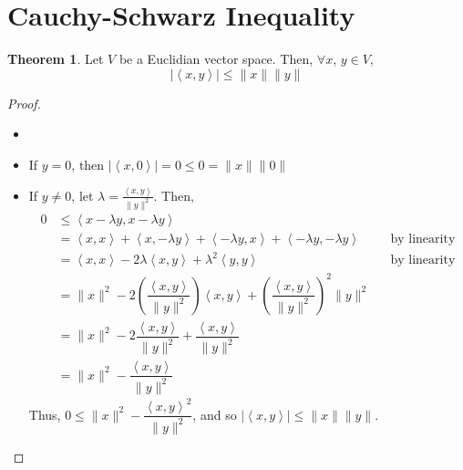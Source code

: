 \documentclass[letterpaper,12pt]{article}
\theoremstyle{definition}
\newtheorem*{theorem}{Theorem}
\newcommand{\abs}[1]{\left\lvert #1 \right\rvert} %
\newcommand{\inp}[2]{\left< #1, #2 \right>}
\newcommand{\norm}[1]{\| #1 \|}
\begin{document}
\section*{Cauchy-Schwarz Inequality}
\begin{theorem}
Let $V$ be a Euclidian vector space. Then, $\forall x$, $y \in V$,
\begin{equation*}
    \boxed{\abs{\inp{x}{y}} \leq \norm{x} \norm{y}}
\end{equation*}
\end{theorem}
\begin{proof}
\begin{itemize}
    \item[]
    \item If $y = 0$, then $\abs{\inp{x}{0}} = 0 \leq 0 = \norm{x} \norm{0}$
    \item If $y \neq 0$, let $\lambda = \frac{\inp{x}{y}}{\norm{y}^2}$. Then,
    \begin{align*}
        0 & \leq \inp{x - \lambda y}{x - \lambda y} \\
        & = \inp{x}{x} + \inp{x}{-\lambda y} + \inp{-\lambda y}{x} + \inp{-\lambda y}{-\lambda y} && \text{by linearity} \\
        & = \inp{x}{x} - 2 \lambda \inp{x}{y} + \lambda^2 \inp{y}{y} && \text{by linearity} \\
        & = \norm{x}^2 - 2\left(\dfrac{\inp{x}{y}}{\norm{y}^2} \right) \inp{x}{y} + \left(\dfrac{\inp{x}{y}}{\norm{y}^2} \right)^2 \norm{y}^2 \\
        & = \norm{x}^2 - 2 \dfrac{\inp{x}{y}}{\norm{y}^2} + \dfrac{\inp{x}{y}}{\norm{y}^2} \\
        & = \norm{x}^2 - \dfrac{\inp{x}{y}}{\norm{y}^2}
    \end{align*}
    Thus, $0 \leq \norm{x}^2 - \dfrac{\inp{x}{y}^2}{\norm{y}^2}$, and so $\abs{\inp{x}{y}} \leq \norm{x} \norm{y}$.
\end{itemize}
\end{proof}
\end{document}
